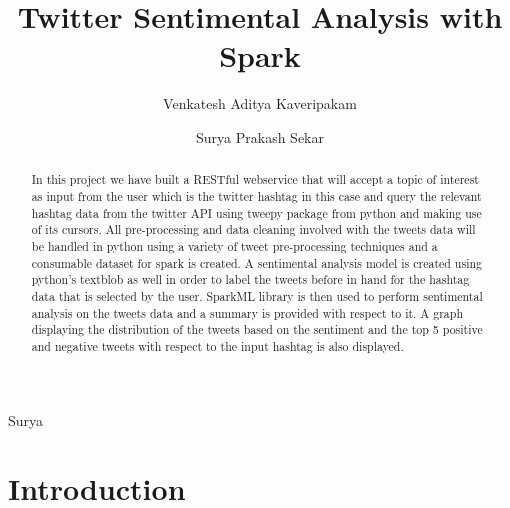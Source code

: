 

\title{Twitter Sentimental Analysis with Spark}


\author{Venkatesh Aditya Kaveripakam}

\author{Surya Prakash Sekar}

\renewcommand{\shortauthors}{Aditya}{Surya}

\begin{abstract}

In this project we have built a RESTful webservice that will accept a topic of 
interest as input from the user which is the twitter hashtag in this case and 
query the relevant hashtag data from the twitter API using tweepy package from 
python and making use of its cursors. All pre-processing and data cleaning 
involved with the tweets data will be handled in python using a variety of 
tweet pre-processing techniques and a consumable dataset for spark is created. A 
sentimental analysis model is created using python's textblob as well in order to label 
the tweets before in hand for the hashtag data that is selected by the user. 
SparkML library is then used to perform sentimental analysis on the tweets data 
and a summary is provided with respect to it. A graph displaying the 
distribution of the tweets based on the sentiment and the top 5 positive and 
negative tweets with respect to the input hashtag is also displayed.

\end{abstract}


\maketitle

\section{Introduction}

